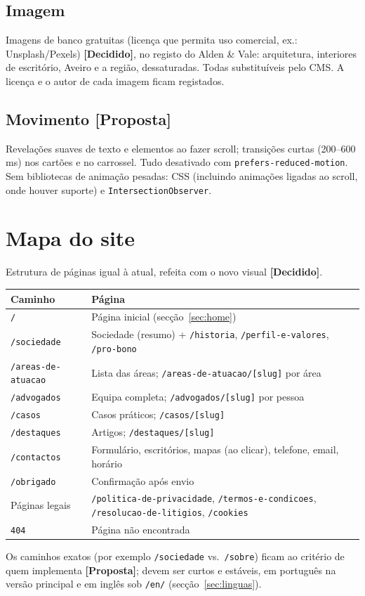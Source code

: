 \documentclass[11pt,a4paper]{article}
\newcommand{\decidido}{\textcolor{verde700}{\textbf{[Decidido]}}}
\newcommand{\proposta}{\textcolor{bronze}{\textbf{[Proposta]}}}
\begin{document}
\subsection{Imagem}
Imagens de banco gratuitas (licença que permita uso comercial, ex.: Unsplash/Pexels) \decidido, no registo do Alden \& Vale: arquitetura, interiores de escritório, Aveiro e a região, dessaturadas. Todas substituíveis pelo CMS. A licença e o autor de cada imagem ficam registados.

\subsection{Movimento \proposta}
Revelações suaves de texto e elementos ao fazer scroll; transições curtas (200--600\,ms) nos cartões e no carrossel. Tudo desativado com \texttt{prefers-reduced-motion}. Sem bibliotecas de animação pesadas: CSS (incluindo animações ligadas ao scroll, onde houver suporte) e \texttt{IntersectionObserver}.

\section{Mapa do site}

Estrutura de páginas igual à atual, refeita com o novo visual \decidido.

\begin{center}
\begin{tabularx}{\textwidth}{lX}
\toprule
\textbf{Caminho} & \textbf{Página} \\
\midrule
\texttt{/} & Página inicial (secção~\ref{sec:home}) \\
\texttt{/sociedade} & Sociedade (resumo) + \texttt{/historia}, \texttt{/perfil-e-valores}, \texttt{/pro-bono} \\
\texttt{/areas-de-atuacao} & Lista das áreas; \texttt{/areas-de-atuacao/[slug]} por área \\
\texttt{/advogados} & Equipa completa; \texttt{/advogados/[slug]} por pessoa \\
\texttt{/casos} & Casos práticos; \texttt{/casos/[slug]} \\
\texttt{/destaques} & Artigos; \texttt{/destaques/[slug]} \\
\texttt{/contactos} & Formulário, escritórios, mapas (ao clicar), telefone, email, horário \\
\texttt{/obrigado} & Confirmação após envio \\
Páginas legais & \texttt{/politica-de-privacidade}, \texttt{/termos-e-condicoes}, \texttt{/resolucao-de-litigios}, \texttt{/cookies} \\
\texttt{404} & Página não encontrada \\
\bottomrule
\end{tabularx}
\end{center}
Os caminhos exatos (por exemplo \texttt{/sociedade} vs.\ \texttt{/sobre}) ficam ao critério de quem implementa \proposta; devem ser curtos e estáveis, em português na versão principal e em inglês sob \texttt{/en/} (secção~\ref{sec:linguas}).
\end{document}
